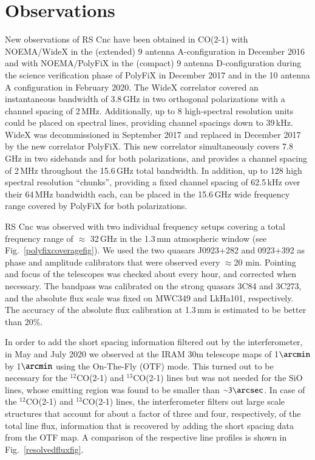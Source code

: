 \documentclass{aa}
\begin{document}
\section{Observations} \label{obssec}

New observations of RS Cnc have been obtained in CO(2-1) with
NOEMA/WideX in the (extended) 9 antenna A-configuration in December
2016 \citep{nht2018}    and with NOEMA/PolyFiX in the (compact) 9
antenna D-configuration during  the science verification phase of
PolyFiX in December 2017 and in the 10 antenna A configuration in
February 2020.    The WideX correlator covered an instantaneous
bandwidth of 3.8\,GHz  in  two orthogonal polarizations with a channel
spacing of 2\,MHz. Additionally, up to 8 high-spectral resolution
units could be placed on spectral lines, providing channel spacings
down to 39\,kHz. WideX was decommissioned in September 2017 and
replaced in December 2017 by the new correlator PolyFiX. This new
correlator simultaneously  covers 7.8\,GHz in two sidebands and for
both polarizations, and provides a channel spacing of 2\,MHz
throughout the 15.6\,GHz total bandwidth.  In addition, up to 128 high
spectral resolution ``chunks'', providing a fixed channel spacing of
62.5\,kHz over their 64\,MHz bandwidth each, can be  placed in the
15.6\,GHz wide frequency range covered by PolyFiX for both
polarizations.

RS Cnc was observed with two individual frequency setups covering a
total frequency range of $\approx$ 32\,GHz in the 1.3\,mm atmospheric
window (see Fig.~\ref{polyfixcoveragefig}).  We used the two quasars
J0923+282 and 0923+392 as phase and amplitude calibrators that were
observed every $\approx$20 min.  Pointing and focus of the telescopes
was checked about every hour, and corrected when necessary.  The
bandpass was calibrated on the strong quasars 3C84 and 3C273,  and the
absolute flux scale was fixed on MWC349 and LkHa101, respectively. The
accuracy of the absolute flux calibration at 1.3\,mm is estimated to
be better than 20\%.

In order to add the short spacing information filtered out by the
interferometer, in May and July 2020 we observed at the IRAM 30m
telescope maps of 1$\arcmin$ by 1$\arcmin$ using the On-The-Fly (OTF)
mode. This turned out to be necessary for the $^{12}$CO(2-1) and
$^{13}$CO(2-1) lines but was not needed for the SiO lines, whose
emitting region was found to be smaller than ${\sim}3\arcsec$.  In
case of the $^{12}$CO(2-1) and $^{13}$CO(2-1) lines, the
interferometer filters out large scale structures that account for
about a factor of three and four, respectively, of the total line
flux, information that is recovered by adding the short spacing data
from the OTF map. A comparison of the respective line profiles is
shown in Fig.~\ref{resolvedfluxfig}.
\end{document}
